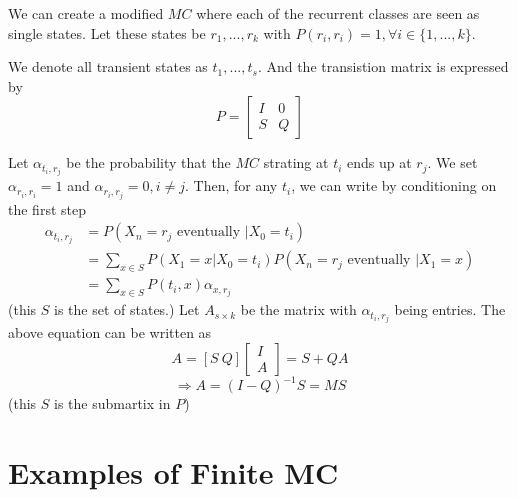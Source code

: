 \documentclass[11pt]{elegantbook}
\begin{document}
We can create a modified $MC$ where each of the recurrent classes are seen as single states. Let these states be $r_1,...,r_k$ with $P (r_i, r_i) = 1,\forall i\in\{1,...,k\}$.

We denote all transient states as $t_1,...,t_s$. And the transistion matrix is expressed by $$P=\begin{bmatrix}
    I&0\\
    S&Q
\end{bmatrix}$$

Let $\alpha_{t_i,r_j}$ be the probability that the $MC$ strating at $t_i$ ends up at $r_j$. We set $\alpha_{r_i,r_i}=1$ and $\alpha_{r_i,r_j}=0,i\neq j$. Then, for any $t_i$, we can write by conditioning on the first step
\begin{equation}
    \begin{aligned}
        \alpha_{t_i,r_j}&=P(X_n=r_j\text{ eventually }|X_0=t_i)\\
        &=\sum_{x\in S}P(X_1=x|X_0=t_i)P(X_n=r_j\text{ eventually }|X_1=x)\\
        &=\sum_{x\in S}P(t_i,x)\alpha_{x,r_j}
    \end{aligned}
    \nonumber
\end{equation}
(this $S$ is the set of states.)
Let $A_{s\times k}$ be the matrix with $\alpha_{t_i,r_j}$ being entries. The above equation can be written as $$A=\left[S\ Q\right]\begin{bmatrix}
    I\\
    A
\end{bmatrix}=S+QA$$
$$\Rightarrow A=(I-Q)^{-1}S=MS$$
(this $S$ is the submartix in $P$)

\section{Examples of Finite MC}
\end{document}
